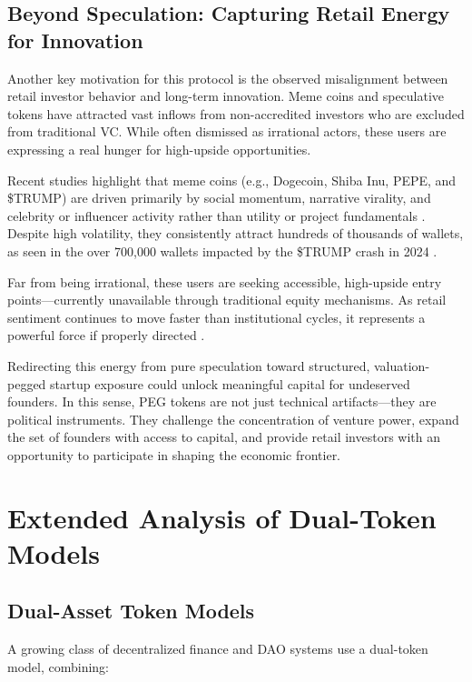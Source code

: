\documentclass[conference]{IEEEtran}
\begin{document}
\subsection{Beyond Speculation: Capturing Retail Energy for Innovation}

Another key motivation for this protocol is the observed misalignment between retail investor behavior and long-term innovation. Meme coins and speculative tokens have attracted vast inflows from non-accredited investors who are excluded from traditional VC. While often dismissed as irrational actors, these users are expressing a real hunger for high-upside opportunities.

Recent studies highlight that meme coins (e.g., Dogecoin, Shiba Inu, PEPE, and \$TRUMP) are driven primarily by social momentum, narrative virality, and celebrity or influencer activity rather than utility or project fundamentals \cite{ssrn4891841, rutgers2023meme}. Despite high volatility, they consistently attract hundreds of thousands of wallets, as seen in the over 700,000 wallets impacted by the \$TRUMP crash in 2024 \cite{wikipediaTrump}.

Far from being irrational, these users are seeking accessible, high-upside entry points—currently unavailable through traditional equity mechanisms. As retail sentiment continues to move faster than institutional cycles, it represents a powerful force if properly directed \cite{marketwatch2022retail, arxiv2104.01847}.

Redirecting this energy from pure speculation toward structured, valuation-pegged startup exposure could unlock meaningful capital for undeserved founders. In this sense, PEG tokens are not just technical artifacts—they are political instruments. They challenge the concentration of venture power, expand the set of founders with access to capital, and provide retail investors with an opportunity to participate in shaping the economic frontier.


\section{Extended Analysis of Dual-Token Models}

\subsection{Dual-Asset Token Models}

A growing class of decentralized finance and DAO systems use a dual-token model, combining:
\end{document}
